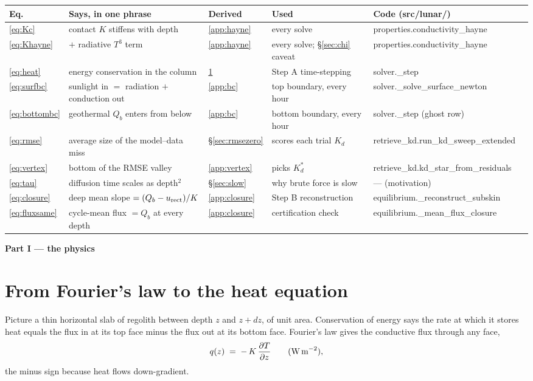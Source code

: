 \documentclass[11pt]{report}
\newcommand{\code}[1]{{\ttfamily\small #1}}
\begin{document}
\begin{center}\footnotesize
\begin{tabular}{@{}llllll@{}}
\toprule
Eq. & Says, in one phrase & Derived & Used & Code (\code{src/lunar/}) \\
\midrule
\eqref{eq:Kc} & contact $K$ stiffens with depth & \ref{app:hayne} & every solve & \code{properties.conductivity\_hayne} \\
\eqref{eq:Khayne} & $+$ radiative $T^3$ term & \ref{app:hayne} & every solve; \S\ref{sec:chi} caveat & \code{properties.conductivity\_hayne} \\
\eqref{eq:heat} & energy conservation in the column & \ref{app:heateq} & Step A time-stepping & \code{solver.\_step} \\
\eqref{eq:surfbc} & sunlight in $=$ radiation $+$ conduction out & \ref{app:bc} & top boundary, every hour & \code{solver.\_solve\_surface\_newton} \\
\eqref{eq:bottombc} & geothermal $Q_b$ enters from below & \ref{app:bc} & bottom boundary, every hour & \code{solver.\_step} (ghost row) \\
\eqref{eq:rmse} & average size of the model--data miss & \S\ref{sec:rmsezero} & scores each trial $K_d$ & \code{retrieve\_kd.run\_kd\_sweep\_extended} \\
\eqref{eq:vertex} & bottom of the RMSE valley & \ref{app:vertex} & picks $K_d^{*}$ & \code{retrieve\_kd.kd\_star\_from\_residuals} \\
\eqref{eq:tau} & diffusion time scales as depth$^2$ & \S\ref{sec:slow} & why brute force is slow & --- (motivation) \\
\eqref{eq:closure} & deep mean slope $=(Q_b-u_{\rm rect})/K$ & \ref{app:closure} & Step B reconstruction & \code{equilibrium.\_reconstruct\_subskin} \\
\eqref{eq:fluxsame} & cycle-mean flux $=Q_b$ at every depth & \ref{app:closure} & certification check & \code{equilibrium.\_mean\_flux\_closure} \\
\bottomrule
\end{tabular}
\end{center}

\bigskip
\noindent\textbf{\textsf{\color{forest} Part I --- the physics}}

\section{From Fourier's law to the heat equation}\label{app:heateq}
Picture a thin horizontal slab of regolith between depth $z$ and $z+dz$, of unit
area. Conservation of energy says the rate at which it stores heat equals the
flux in at its top face minus the flux out at its bottom face. Fourier's law
gives the conductive flux through any face,
\[
q(z) \;=\; -\,K\,\frac{\partial T}{\partial z}
\qquad(\text{W\,m}^{-2}),
\]
the minus sign because heat flows down-gradient.
\end{document}
